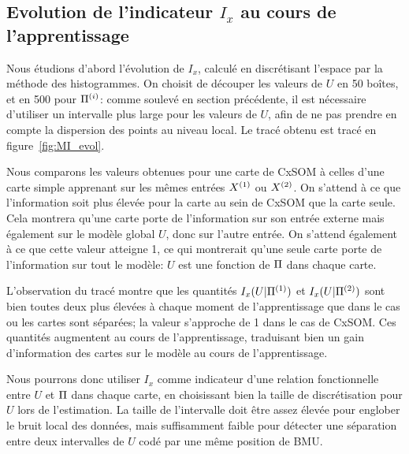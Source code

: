 \subsection{Evolution de l'indicateur $I_x$ au cours de l'apprentissage}

Nous étudions d'abord l'évolution de $I_x$, calculé en discrétisant l'espace par la méthode des histogrammes.
On choisit de découper les valeurs de $U$ en 50 boîtes, et en 500 pour $\Pi^{({i})}$: comme soulevé en section précédente, il est nécessaire d'utiliser un intervalle plus large pour les valeurs de $U$, afin de ne pas prendre en compte la dispersion des points au niveau local. Le tracé obtenu est tracé en figure~\ref{fig:MI_evol}.

Nous comparons les valeurs obtenues pour une carte de CxSOM à celles d'une carte simple apprenant sur les mêmes entrées $X^{({1})}$ ou $X^{({2})}$.
On s'attend à ce que l'information soit plus élevée pour la carte au sein de CxSOM que la carte seule. Cela montrera qu'une carte porte de l'information sur son entrée externe mais également sur le modèle global $U$, donc sur l'autre entrée.
On s'attend également à ce que cette valeur atteigne 1, ce qui montrerait qu'une seule carte porte de l'information sur tout le modèle: $U$ est une fonction de $\Pi$ dans chaque carte.

L'observation du tracé montre que les quantités $I_x(U|\Pi^{({1})})$ et $I_x(U|\Pi^{({2})})$ sont bien toutes deux plus élevées à chaque moment de l'apprentissage que dans le cas ou les cartes sont séparées; la valeur s'approche de 1 dans le cas de CxSOM.
Ces quantités augmentent au cours de l'apprentissage, traduisant bien un gain d'information des cartes sur le modèle au cours de l'apprentissage.

Nous pourrons donc utiliser $I_x$ comme indicateur d'une relation fonctionnelle entre $U$ et $\Pi$ dans chaque carte, en choisissant bien la taille de discrétisation pour $U$ lors de l'estimation. La taille de l'intervalle doit être assez élevée pour englober le bruit local des données, mais suffisamment faible pour détecter une séparation entre deux intervalles de $U$ codé par une même position de BMU.

